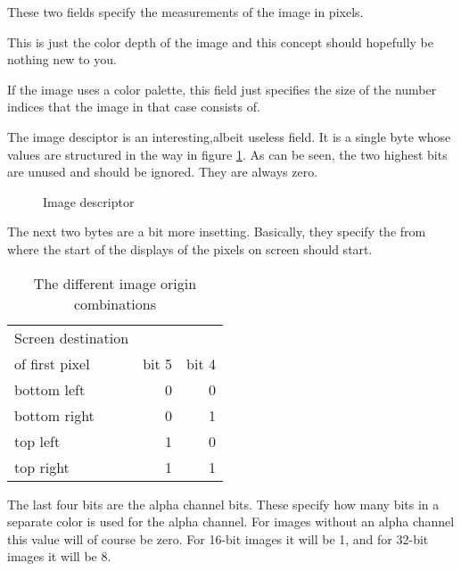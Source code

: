 \begin{refsection}

  These two fields specify the measurements of the image in pixels.


  This is just the color depth of the image and this concept should
  hopefully be nothing new to you.

  If the image uses a color palette, this field just specifies the
  size of the number indices that the image in that case consists of.


  The image desciptor is an interesting,albeit useless field. It is a
  single byte whose values are structured in the way in figure
  \ref{fig:tga-image-desc}. As can be seen, the two highest
  bits are unused and should be ignored. They are always zero.

  \begin{figure}[H]
    \centering
    \caption{Image descriptor}
    \label{fig:tga-image-desc}
  \end{figure}

  The next two bytes are a bit more insetting. Basically, they specify
  the from where the start of the displays of the pixels on screen
  should start.


  \begin{table}
    \centering
    \begin{tabular}{lrr}
      \toprule
      Screen destination \\ of first pixel & bit 5 & bit 4 \\
      \midrule
      bottom left & 0 & 0 \\
      bottom right & 0 & 1 \\
      top left & 1 & 0 \\
      top right & 1 & 1 \\
      \bottomrule
    \end{tabular}
    \caption{The different image origin combinations}
    \label{tab:image-origin}
  \end{table}

  The last four bits are the alpha channel bits. These specify how
  many bits in a separate color is used for the alpha channel. For
  images without an alpha channel this value will of course be
  zero. For 16-bit images it will be 1, and for 32-bit images it will
  be 8.


\end{refsection}
